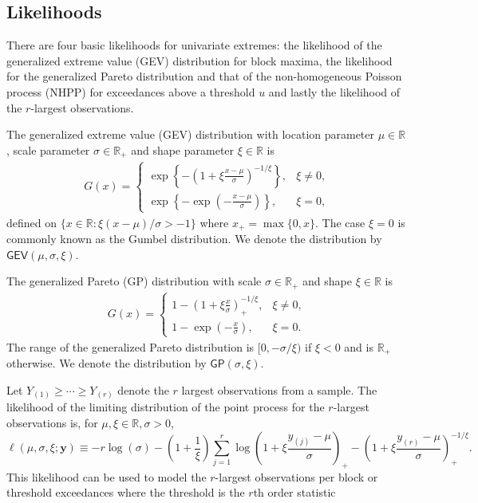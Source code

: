 \documentclass[]{book}
\begin{document}
\hypertarget{likelihoods}{%
\subsection{Likelihoods}\label{likelihoods}}

There are four basic likelihoods for univariate extremes: the likelihood of the generalized extreme value (GEV) distribution for block maxima, the likelihood for the generalized Pareto distribution and that of the non-homogeneous Poisson process (NHPP) for exceedances above a threshold \(u\) and lastly the likelihood of the \(r\)-largest observations.

The generalized extreme value (GEV) distribution with location parameter \(\mu \in \mathbb{R}\), scale parameter \(\sigma \in \mathbb{R}_{+}\) and shape
parameter \(\xi \in \mathbb{R}\) is
\begin{align*}
  G(x)  = 
\begin{cases}
\exp\left\{-\left(1+\xi \frac{x-\mu}{\sigma}\right)^{-1/\xi}\right\}, &  \xi \neq 0,\\
\exp \left\{ -\exp \left(-\frac{x-\mu}{\sigma}\right)\right\},&  \xi = 0,
\end{cases} 
 \end{align*}
defined on \(\{x \in \mathbb{R}: \xi(x-\mu)/\sigma > -1\}\) where \(x_{+} = \max\{0, x\}\). The case \(\xi=0\) is commonly known as the Gumbel
distribution.
We denote the distribution by \(\mathsf{GEV}(\mu, \sigma, \xi)\).

The generalized Pareto (GP) distribution with scale \(\sigma \in \mathbb{R}_{+}\) and shape \(\xi \in \mathbb{R}\) is
\begin{align*}
  G(x)  = 
\begin{cases}
1-\left(1+\xi \frac{x}{\sigma}\right)_{+}^{-1/\xi}, &  \xi \neq 0,\\ 1-
\exp \left(-\frac{x}{\sigma}\right),&  \xi = 0.
\end{cases}
 \end{align*}
The range of the generalized Pareto distribution is \([0, -\sigma/\xi)\) if \(\xi < 0\) and is \(\mathbb{R}_{+}\) otherwise. We denote the distribution
by \(\mathsf{GP}(\sigma, \xi)\).

Let \(Y_{(1)} \geq \cdots \geq Y_{(r)}\) denote the \(r\) largest observations from a sample. The likelihood of the limiting distribution of the point process for the \(r\)-largest observations is, for \(\mu,\xi\in\mathbb{R}, \sigma>0\), \[
\ell(\mu,\sigma,\xi; \boldsymbol{y}) \equiv  -r\log(\sigma) - \left(1+\frac{1}{\xi}\right)\sum_{j=1}^r \log\left(1 + \xi\frac{y_{(j)}-\mu}{\sigma}\right)_{+} - \left(1 + \xi\frac{y_{(r)}-\mu}{\sigma}\right)^{-1/\xi}_+.
\]
This likelihood can be used to model the \(r\)-largest observations per block or threshold exceedances where the threshold is the \(r\)th order statistic
\end{document}
